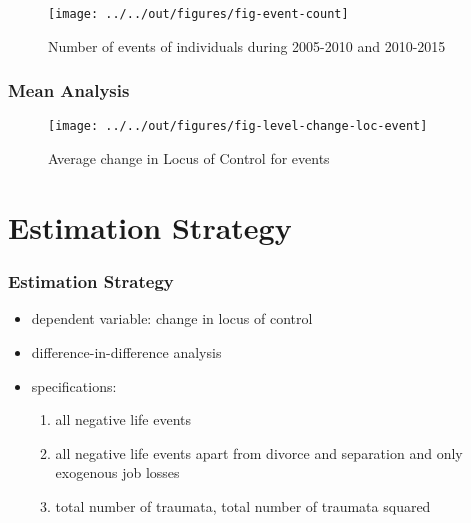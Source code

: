 \documentclass{beamer}
\begin{document}
\begin{frame}[plain]

\begin{figure}[H]
    \centering
    \texttt{[image: ../../out/figures/fig-event-count]}
    \caption{Number of events of individuals during 2005-2010 and 2010-2015}
    \label{fig:event_count}
\end{figure}

\end{frame}

\begin{frame}[t]\frametitle{Mean Analysis}

\begin{figure}[H]
    \centering
    \texttt{[image: ../../out/figures/fig-level-change-loc-event]}
    \caption{Average change in Locus of Control for events}
    \label{fig:level_change_loc_event}
\end{figure}


\end{frame}



\section{Estimation Strategy} %
\label{sec:estimation_strategy}

\begin{frame}[t]\frametitle{Estimation Strategy}
	\begin{itemize}
		\item<+-> dependent variable: change in locus of control
		\item<+-> difference-in-difference analysis
		\item<+-> specifications:
		\begin{enumerate}
			\item all negative life events
			\item all negative life events apart from divorce and separation and only exogenous job losses
			\item total number of traumata, total number of traumata squared
		\end{enumerate}
	\end{itemize}
\end{frame}
\end{document}
